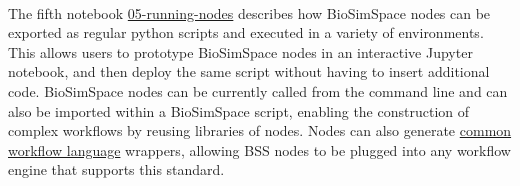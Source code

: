 \\
%
The fifth notebook \href{https://github.com/OpenBioSim/biosimspace_tutorials/blob/main/01_introduction/05_running_nodes.ipynb}{05-running-nodes} describes how BioSimSpace nodes can be exported as regular python scripts and executed in a variety of environments. This allows users to prototype BioSimSpace nodes in an interactive Jupyter notebook, and then deploy the same script without having to insert additional code. BioSimSpace nodes can be currently called from the command line and can also be imported within a BioSimSpace script, enabling the construction of complex workflows by reusing libraries of nodes. Nodes can also generate \href{https://www.commonwl.org}{common workflow language} wrappers, allowing BSS nodes to be plugged into any workflow engine that supports this standard. 
\\
